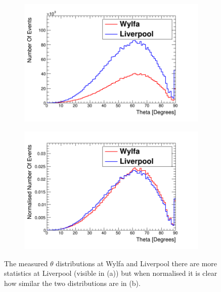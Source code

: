 \begin{figure}[!h]
\centering
\begin{subfigure}{.5\textwidth}
  \centering
  \includegraphics[width=\linewidth]{Chapter6/Figs/thetaWylfaLiverpoolNew.png}
  \captionsetup{width=.9\linewidth}
  \caption{}
  \label{subFig:measuredThetaWylfaLiv}
\end{subfigure}%
\begin{subfigure}{.5\textwidth}
  \centering
\includegraphics[width=\linewidth]{Chapter6/Figs/thetaWylfaLiverpoolNewNorm.png}
  \captionsetup{width=.9\linewidth}
  \caption{}
  \label{subFig:measuredThetaWylfaLivNorm}
\end{subfigure}
\caption{The measured $\theta$ distributions at Wylfa and Liverpool there are more statistics at Liverpool (visible in (a)) but when normalised it is clear how similar the two distributions are in (b).}
\label{fig:measuredThetaWylfaLiverpool}
\end{figure}

